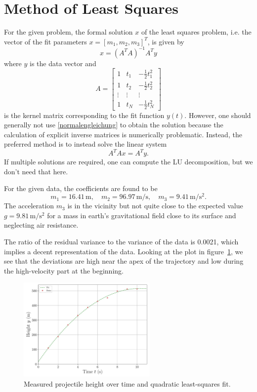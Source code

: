 \documentclass[a4paper,DIV=12,english]{scrartcl}
\begin{document}
\FloatBarrier
\newpage
\section{Method of Least Squares}
For the given problem, the formal solution $x$ of the least squares problem, i.e. the vector of the fit parameters $x=[m_1, m_2, m_3]^T$, is given by
\begin{equation}\label{normalengleichung}
    x = (A^T A)^{-1} A^T y
\end{equation}
where $y$ is the data vector and
\begin{equation}
    A = 
    \begin{bmatrix}
        1 & t_1 & - \frac{1}{2} t_1^2 \\    
        1 & t_2 & - \frac{1}{2} t_2^2 \\
        \vdots & \vdots & \vdots \\
        1 & t_N & - \frac{1}{2} t_N^2
    \end{bmatrix}
\end{equation}
is the kernel matrix corresponding to the fit function $y(t)$.
However, one should generally not use \eqref{normalengleichung} to obtain the solution because the calculation of explicit inverse matrices is numerically problematic. Instead, the preferred method is to instead solve the linear system
\begin{equation}
    A^T Ax = A^T y.
\end{equation}
If multiple solutions are required, one can compute the LU decomposition, but we don't need that here.

For the given data, the coefficients are found to be
\begin{equation*}
    m_1 = 16.41\,\text{m},\quad m_2 = 96.97\,\text{m/s},\quad m_3 = 9.41\,\text{m}/\text{s}^2.
\end{equation*}
The acceleration $m_3$ is in the vicinity but not quite close to the expected value $g=9.81\,\text{m}/\text{s}^2$ for a mass in earth's gravitational field close to its surface and neglecting air resistance.

The ratio of the residual variance to the variance of the data is 0.0021, which implies a decent representation of the data. Looking at the plot in figure~\ref{fig:lstsq}, we see that the deviations are high near the apex of the trajectory and low during the high-velocity part at the beginning.
\begin{figure}[h]
    \centering
    \includegraphics[width=0.6\textwidth]{../lstsq.pdf}
    \caption{Measured projectile height over time and quadratic least-squares fit.}
    \label{fig:lstsq}
\end{figure}
\end{document}
